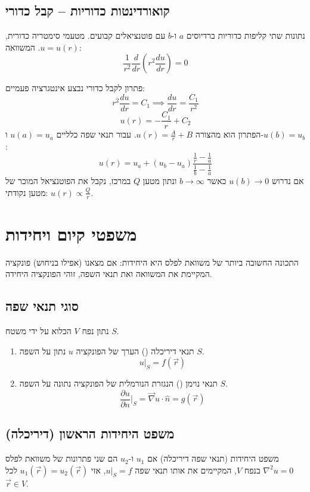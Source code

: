 \subsection{קואורדינטות כדוריות – קבל כדורי}
נתונות שתי קליפות כדוריות ברדיוסים $a$ ו-$b$ עם פוטנציאלים קבועים. מטעמי סימטריה כדורית, $u=u(r)$.
המשוואה:
\[ \frac{1}{r^2} \frac{d}{dr} \left( r^2 \frac{du}{dr} \right) = 0 \]

\begin{examplebox}{פתרון לקבל כדורי}
נבצע אינטגרציה פעמיים:
\[ r^2 \frac{du}{dr} = C_1 \implies \frac{du}{dr} = \frac{C_1}{r^2} \]
\[ u(r) = -\frac{C_1}{r} + C_2 \]
הפתרון הוא מהצורה $u(r) = \frac{A}{r} + B$.
עבור תנאי שפה כלליים $u(a)=u_a$ ו-$u(b)=u_b$:
\[ u(r) = u_a + (u_b - u_a) \frac{\frac{1}{r} - \frac{1}{a}}{\frac{1}{b} - \frac{1}{a}} \]
אם נדרוש $u(b) \to 0$ כאשר $b \to \infty$ ונתון מטען $Q$ במרכז, נקבל את הפוטנציאל המוכר של מטען נקודתי: $u(r) \propto \frac{Q}{r}$.
\end{examplebox}

\section{משפטי קיום ויחידות}

התכונה החשובה ביותר של משוואת לפלס היא היחידות: אם מצאנו (אפילו בניחוש) פונקציה המקיימת את המשוואה ואת תנאי השפה, זוהי הפונקציה היחידה.

\subsection{סוגי תנאי שפה}
נתון נפח $V$ הכלוא על ידי משטח $S$.
\begin{enumerate}
    \item תנאי דיריכלה () הערך של הפונקציה $u$ נתון על השפה $S$.
    \[ u|_S = f(\vec{r}) \]
    \item תנאי נוימן () הנגזרת הנורמלית של הפונקציה נתונה על השפה $S$.
    \[ \frac{\partial u}{\partial n}\bigg|_S = \vec{\nabla} u \cdot \hat{n} = g(\vec{r}) \]
\end{enumerate}

\subsection{משפט היחידות הראשון (דיריכלה)}
\begin{theorembox}{משפט היחידות (תנאי שפה דיריכלה)}
אם $u_1$ ו-$u_2$ הם שני פתרונות של משוואת לפלס $\nabla^2 u = 0$ בנפח $V$, המקיימים את אותו תנאי שפה $u|_S = f$, אזי $u_1(\vec{r}) = u_2(\vec{r})$ לכל $\vec{r} \in V$.
\end{theorembox}

